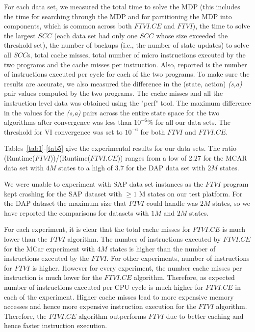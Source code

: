 \documentclass[conference]{IEEEtran}
\begin{document}
For each data set, we measured the total time to solve the MDP (this includes the time for searching through the MDP and for partitioning the MDP into components, which is common across both \textit{$FTVI.CE$} and \textit{$FTVI$}),
the time to solve the largest $SCC$ (each data set had only one $SCC$ whose size exceeded the threshold set), the number of backups (i.e., the number of state updates) to solve all $SCC$s, total cache misses, total number of micro instructions executed by the two programs and the cache misses per instruction. Also, reported is the number of instructions executed per cycle for each of the two programs. To make sure the results are accurate, we also measured the difference in the (state, action) \textit{(s,a)} pair values computed by the two programs.
The cache misses and all the instruction level data was obtained using the "perf" \cite{perf} tool.
The maximum difference in the values for the \textit{(s,a)} pairs across the entire state space for the two algorithms after convergence was less than $10^{-6}\%$ for all our data sets. The threshold for VI convergence was set to $10^{-6}$ for both $FTVI$ and $FTVI.CE$.

Tables~\ref{tab1}-\ref{tab5} give the experimental results for our data sets. The ratio (Runtime($FTVI$))/(Runtime($FTVI.CE$)) ranges from a low of $2.27$ for the MCAR data set with $4M$ states to a high of $3.7$ for the DAP data set with $2M$ states.

We were unable to experiment with SAP data set instances as the $FTVI$ program kept crashing for the SAP dataset with $\ge1$ M states  on our test platform. For the DAP dataset the maximum size that $FTVI$ could handle was $2M$ states, so we have reported the comparisons for datasets with $1M$ and $2M$ states.

For each experiment, it is clear that the total cache misses for $FTVI.CE$ is much lower than the $FTVI$ algorithm. The number of instructions executed by $FTVI.CE$ for the MCar experiment with $4M$ states is higher than the number of instructions executed by the $FTVI$. For other experiments, number of instructions for $FTVI$ is higher. However for every experiment, the number cache misses per instruction is much lower for the $FTVI.CE$ algorithm. Therefore, as expected number of instructions executed per CPU cycle is much higher for $FTVI.CE$ in each of the experiment. Higher cache misses lead to more expensive memory accesses and hence more expensive instruction execution for the $FTVI$ algorithm. Therefore, the $FTVI.CE$ algorithm outperforms $FTVI$ due to better caching and hence faster instruction execution.
\end{document}
